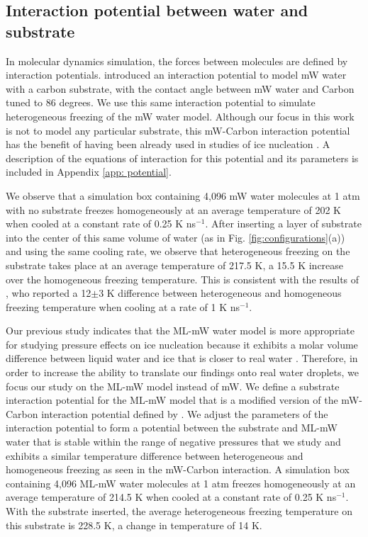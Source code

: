 \documentclass[journal abbreviation, manuscript]{copernicus}
\begin{document}
\subsection{Interaction potential between water and substrate}

In molecular dynamics simulation, the forces between molecules are defined by interaction potentials. \citet{lupi2014} introduced an interaction potential to model mW water with a carbon substrate, with the contact angle between mW water and Carbon tuned to 86 degrees. We use this same interaction potential to simulate heterogeneous freezing of the mW water model. Although our focus in this work is not to model any particular substrate, this mW-Carbon interaction potential has the benefit of having been already used in studies of ice nucleation \citep{lupi2014, Bi2016}. A description of the equations of interaction for this potential and its parameters is included in Appendix \ref{app: potential}.

We observe that a simulation box containing 4,096 mW water molecules at 1 atm with no substrate freezes homogeneously at an average temperature of 202 K when cooled at a constant rate of 0.25 K ns$^{-1}$. After inserting a layer of substrate into the center of this same volume of water (as in Fig. \ref{fig:configurations}(a)) and using the same cooling rate, we observe that heterogeneous freezing on the substrate takes place at an average temperature of 217.5 K, a 15.5 K increase over the homogeneous freezing temperature. This is consistent with the results of \citet{lupi2014}, who reported a 12$\pm$3 K difference between heterogeneous and homogeneous freezing temperature when cooling at a rate of 1 K ns$^{-1}$.

Our previous study \citep{rosky2022} indicates that the ML-mW water model is more appropriate for studying pressure effects on ice nucleation because it exhibits a molar volume difference between liquid water and ice that is closer to real water \citep{chan2019}. Therefore, in order to increase the ability to translate our findings onto real water droplets, we focus our study on the ML-mW model instead of mW. We define a substrate interaction potential for the ML-mW model that is a modified version of the mW-Carbon interaction potential defined by \citet{lupi2014}. We adjust the parameters of the interaction potential to form a potential between the substrate and ML-mW water that is stable within the range of negative pressures that we study and exhibits a similar temperature difference between heterogeneous and homogeneous freezing as seen in the mW-Carbon interaction. A simulation box containing 4,096 ML-mW water molecules at 1 atm freezes homogeneously at an average temperature of 214.5 K when cooled at a constant rate of 0.25 K ns$^{-1}$. With the substrate inserted, the average heterogeneous freezing temperature on this substrate is 228.5 K, a change in temperature of 14 K. 
\end{document}
